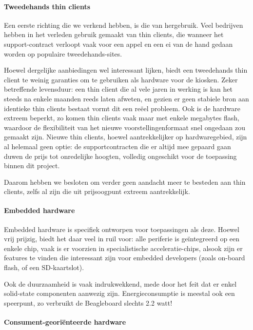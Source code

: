 \paragraph{Tweedehands thin clients}

Een eerste richting die we verkend hebben, is die van hergebruik. Veel bedrijven hebben in het verleden gebruik gemaakt van thin clients, die wanneer het support-contract verloopt vaak voor een appel en een ei van de hand gedaan worden op populaire tweedehands-sites.

Hoewel dergelijke aanbiedingen wel interessant lijken, biedt een tweedehands thin client te weinig garanties om te gebruiken als hardware voor de kiosken. Zeker betreffende levensduur: een thin client die al vele jaren in werking is kan het steeds na enkele maanden reeds laten afweten, en gezien er geen stabiele bron aan identieke thin clients bestaat vormt dit een reëel probleem. Ook is de hardware extreem beperkt, zo komen thin clients vaak maar met enkele megabytes flash, waardoor de flexibiliteit van het nieuwe voorstellingenformaat snel ongedaan zou gemaakt zijn. Nieuwe thin clients, hoewel aantrekkelijker op hardwaregebied, zijn al helemaal geen optie: de supportcontracten die er altijd mee gepaard gaan duwen de prijs tot onredelijke hoogten, volledig ongeschikt voor de toepassing binnen dit project.

Daarom hebben we besloten om verder geen aandacht meer te besteden aan thin clients, zelfs al zijn die uit prijsoogpunt extreem aantrekkelijk.

\paragraph{Embedded hardware}

Embedded hardware is specifiek ontworpen voor toepassingen als deze. Hoewel vrij prijzig, biedt het daar veel in ruil voor: alle periferie is geïntegreerd op een enkele chip, vaak is er voorzien in specialistische acceleratie-chips, alsook zijn er features te vinden die interessant zijn voor embedded developers (zoals on-board flash, of een SD-kaartslot).

Ook de duurzaamheid is vaak indrukwekkend, mede door het feit dat er enkel solid-state componenten aanwezig zijn. Energieconsumptie is meestal ook een speerpunt, zo verbruikt de Beagleboard slechts 2.2 watt!

\paragraph{Consument-georiënteerde hardware}

